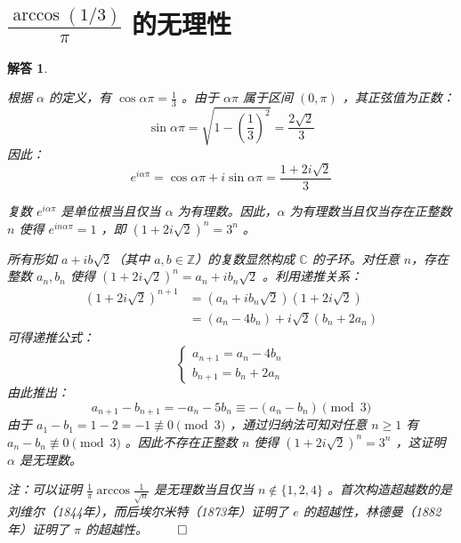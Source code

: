 \documentclass[12pt,UTF8,fontset=none]{ctexbook}
\theoremstyle{exercisestyle}
\theoremstyle{solutionstyle}
\newtheorem*{solution*}{解答}
\newenvironment{solution}
  {\begin{solution*}}
  {\hfill\ensuremath{\qed}\end{solution*}}
\begin{document}
\section{$\frac{\arccos (1/3)}{\pi}$ 的无理性}
\begin{solution}
\begin{subquestions}
\item 根据 $\alpha$ 的定义，有 $\cos \alpha \pi = \frac{1}{3}$ 。由于 $\alpha \pi$ 属于区间 $(0, \pi)$ ，其正弦值为正数：
$$
\sin \alpha \pi = \sqrt{1 - \left(\frac{1}{3}\right)^2} = \frac{2\sqrt{2}}{3}
$$
因此：
$$
e^{i\alpha\pi} = \cos \alpha \pi + i\sin \alpha \pi = \frac{1+2i\sqrt{2}}{3}
$$

\item 复数 $e^{i\alpha\pi}$ 是单位根当且仅当 $\alpha$ 为有理数。因此，$\alpha$ 为有理数当且仅当存在正整数 $n$ 使得 $e^{in\alpha\pi} = 1$ ，即 $(1+2i\sqrt{2})^n = 3^n$ 。

\item 所有形如 $a+ib\sqrt{2}$（其中 $a,b \in \mathbb{Z}$）的复数显然构成 $\mathbb{C}$ 的子环。对任意 $n$，存在整数 $a_n,b_n$ 使得 $(1+2i\sqrt{2})^n = a_n + ib_n\sqrt{2}$ 。利用递推关系：
$$
\begin{aligned}
(1+2i\sqrt{2})^{n+1} &= (a_n+ib_n\sqrt{2})(1+2i\sqrt{2}) \\
&= (a_n - 4b_n) + i\sqrt{2}(b_n + 2a_n)
\end{aligned}
$$
可得递推公式：
$$
\begin{cases}
a_{n+1} = a_n - 4b_n \\
b_{n+1} = b_n + 2a_n
\end{cases}
$$
由此推出：
$$
a_{n+1} - b_{n+1} = -a_n - 5b_n \equiv -(a_n - b_n) \pmod{3}
$$
由于 $a_1 - b_1 = 1 - 2 = -1 \not\equiv 0 \pmod{3}$ ，通过归纳法可知对任意 $n \geq 1$ 有 $a_n - b_n \not\equiv 0 \pmod{3}$ 。因此不存在正整数 $n$ 使得 $(1 + 2i\sqrt{2})^n = 3^n$ ，这证明 $\alpha$ 是无理数。
\end{subquestions}

注：可以证明 $\frac{1}{\pi}\arccos \frac{1}{\sqrt{n}}$ 是无理数当且仅当 $n \notin \{1, 2, 4\}$ 。首次构造超越数的是刘维尔（1844年），而后埃尔米特（1873年）证明了 $e$ 的超越性，林德曼（1882年）证明了 $\pi$ 的超越性。
\end{solution}
\end{document}
